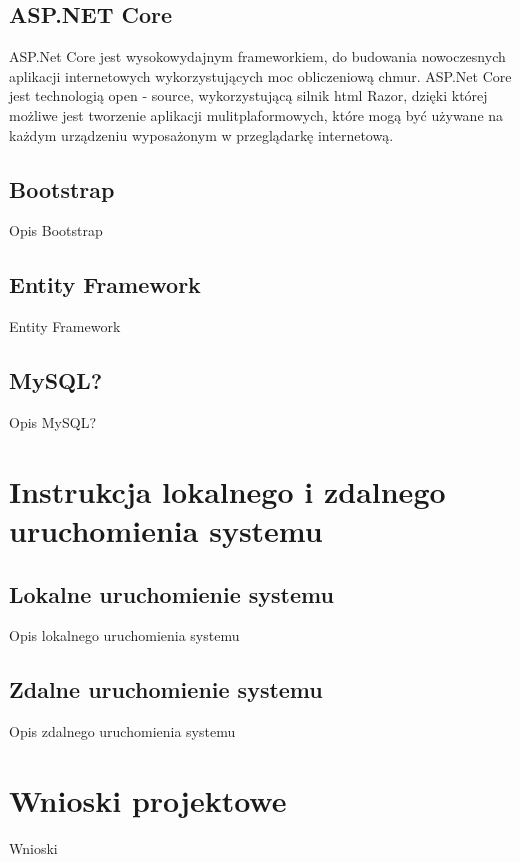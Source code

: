 \documentclass[12pt,a4paper]{article}
\begin{document}
		\subsection{ASP.NET Core}
			ASP.Net Core jest wysokowydajnym frameworkiem, do budowania nowoczesnych aplikacji internetowych wykorzystujących moc obliczeniową chmur. ASP.Net Core jest technologią open - source,
			wykorzystującą silnik html Razor, dzięki której możliwe jest tworzenie aplikacji mulitplaformowych, które mogą być używane na każdym urządzeniu wyposażonym w przeglądarkę
			internetową.
			
		\subsection{Bootstrap}		
			Opis Bootstrap

		\subsection{Entity Framework}		 
		 Entity Framework

		\subsection{MySQL?}		 
		 	Opis MySQL?
	
	\section{Instrukcja lokalnego i zdalnego uruchomienia systemu}
		\subsection{Lokalne uruchomienie systemu}
			Opis lokalnego uruchomienia systemu
		\subsection{Zdalne uruchomienie systemu}
			Opis zdalnego uruchomienia systemu
	
	\section{Wnioski projektowe}
		Wnioski
\end{document}
